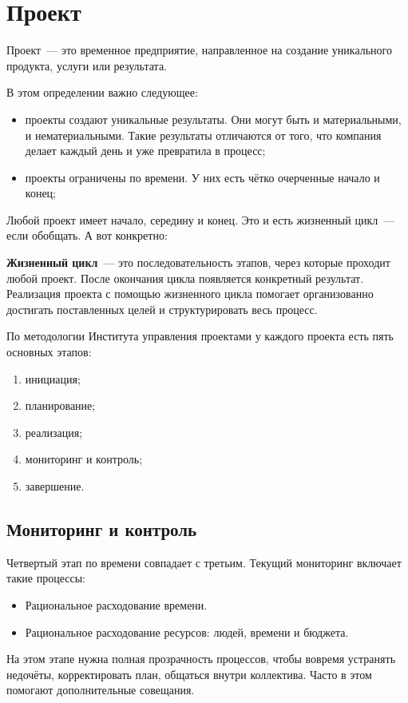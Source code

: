 \chapter{Проект}

Проект~--- это временное предприятие, направленное на создание уникального продукта, услуги или результата. 

В этом определении важно следующее:
\begin{itemize}
	\item проекты создают уникальные результаты. 
	Они могут быть и материальными, и нематериальными. 
	Такие результаты отличаются от того, что компания делает каждый день и уже превратила в процесс;
	\item проекты ограничены по времени. 
	У них есть чётко очерченные начало и конец;
\end{itemize}

Любой проект имеет начало, середину и конец. 
Это и есть жизненный цикл~--- если обобщать. А вот конкретно:

	\textbf{Жизненный цикл}~--- это последовательность этапов, через которые проходит любой проект. 
	После окончания цикла появляется конкретный результат. Реализация проекта с помощью жизненного цикла помогает организованно достигать поставленных целей и структурировать весь процесс.
	
По методологии Института управления проектами у каждого проекта есть пять основных этапов: 
\begin{enumerate}
	\item инициация;
	\item планирование;
	\item реализация;
	\item мониторинг и контроль;
	\item завершение.
\end{enumerate}

\section{Мониторинг и контроль}
Четвертый этап по времени совпадает с третьим. Текущий мониторинг включает такие процессы:
\begin{itemize}
	\item Рациональное расходование времени. 
	\item Рациональное расходование ресурсов: людей, времени и бюджета.
\end{itemize}
На этом этапе нужна полная прозрачность процессов, чтобы вовремя устранять недочёты, корректировать план, общаться внутри коллектива. Часто в этом помогают дополнительные совещания.